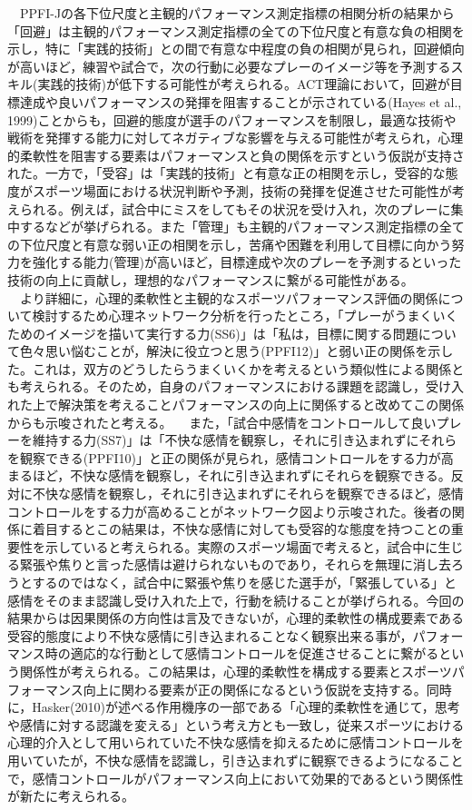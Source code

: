 \documentclass[12pt,a4paper,xelatex,ja=standard]{bxjsarticle}
\begin{document}
　PPFI-Jの各下位尺度と主観的パフォーマンス測定指標の相関分析の結果から「回避」は主観的パフォーマンス測定指標の全ての下位尺度と有意な負の相関を示し，特に「実践的技術」との間で有意な中程度の負の相関が見られ，回避傾向が高いほど，練習や試合で，次の行動に必要なプレーのイメージ等を予測するスキル(実践的技術)が低下する可能性が考えられる。ACT理論において，回避が目標達成や良いパフォーマンスの発揮を阻害することが示されている(Hayes
et al.,
1999)ことからも，回避的態度が選手のパフォーマンスを制限し，最適な技術や戦術を発揮する能力に対してネガティブな影響を与える可能性が考えられ，心理的柔軟性を阻害する要素はパフォーマンスと負の関係を示すという仮説が支持された。一方で，「受容」は「実践的技術」と有意な正の相関を示し，受容的な態度がスポーツ場面における状況判断や予測，技術の発揮を促進させた可能性が考えられる。例えば，試合中にミスをしてもその状況を受け入れ，次のプレーに集中するなどが挙げられる。また「管理」も主観的パフォーマンス測定指標の全ての下位尺度と有意な弱い正の相関を示し，苦痛や困難を利用して目標に向かう努力を強化する能力(管理)が高いほど，目標達成や次のプレーを予測するといった技術の向上に貢献し，理想的なパフォーマンスに繋がる可能性がある。\\
　より詳細に，心理的柔軟性と主観的なスポーツパフォーマンス評価の関係について検討するため心理ネットワーク分析を行ったところ，「プレーがうまくいくためのイメージを描いて実行する力(SS6)」は「私は，目標に関する問題について色々思い悩むことが，解決に役立つと思う(PPFI12)」と弱い正の関係を示した。これは，双方のどうしたらうまくいくかを考えるという類似性による関係とも考えられる。そのため，自身のパフォーマンスにおける課題を認識し，受け入れた上で解決策を考えることパフォーマンスの向上に関係すると改めてこの関係からも示唆されたと考える。
　また，「試合中感情をコントロールして良いプレーを維持する力(SS7)」は「不快な感情を観察し，それに引き込まれずにそれらを観察できる(PPFI10)」と正の関係が見られ，感情コントロールをする力が高まるほど，不快な感情を観察し，それに引き込まれずにそれらを観察できる。反対に不快な感情を観察し，それに引き込まれずにそれらを観察できるほど，感情コントロールをする力が高めることがネットワーク図より示唆された。後者の関係に着目するとこの結果は，不快な感情に対しても受容的な態度を持つことの重要性を示していると考えられる。実際のスポーツ場面で考えると，試合中に生じる緊張や焦りと言った感情は避けられないものであり，それらを無理に消し去ろうとするのではなく，試合中に緊張や焦りを感じた選手が，「緊張している」と感情をそのまま認識し受け入れた上で，行動を続けることが挙げられる。今回の結果からは因果関係の方向性は言及できないが，心理的柔軟性の構成要素である受容的態度により不快な感情に引き込まれることなく観察出来る事が，パフォーマンス時の適応的な行動として感情コントロールを促進させることに繋がるという関係性が考えられる。この結果は，心理的柔軟性を構成する要素とスポーツパフォーマンス向上に関わる要素が正の関係になるという仮説を支持する。同時に，Hasker(2010)が述べる作用機序の一部である「心理的柔軟性を通じて，思考や感情に対する認識を変える」という考え方とも一致し，従来スポーツにおける心理的介入として用いられていた不快な感情を抑えるために感情コントロールを用いていたが，不快な感情を認識し，引き込まれずに観察できるようになることで，感情コントロールがパフォーマンス向上において効果的であるという関係性が新たに考えられる。
\end{document}
